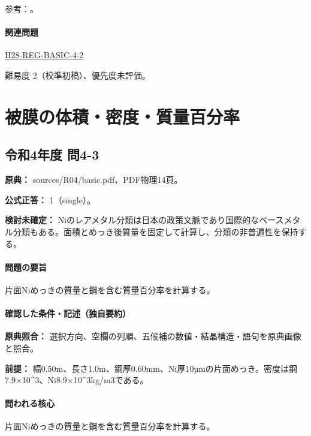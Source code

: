 \par 参考：\cite{iupac_isotopes}。

\paragraph{関連問題} \hyperref[q:h28-reg-basic-4-2]{H28-REG-BASIC-4-2}

\par 難易度 2（校準初稿）、優先度未評価。

\section{被膜の体積・密度・質量百分率}

\subsection{令和4年度 問4-3}
\label{q:r04-reg-basic-4-3}

\noindent\textbf{原典：} sources/R04/basic.pdf、PDF物理14頁。

\textbf{公式正答：} 1（single）。

\par\textbf{検討未確定：} Niのレアメタル分類は日本の政策文脈であり国際的なベースメタル分類もある。面積とめっき後質量を固定して計算し、分類の非普遍性を保持する。

\paragraph{問題の要旨} 片面Niめっきの質量と鋼を含む質量百分率を計算する。

\paragraph{確認した条件・記述（独自要約）}\mbox{}\par

\noindent\textbf{原典照合：} 選択方向、空欄の列順、五候補の数値・結晶構造・語句を原典画像と照合。\par

\noindent\textbf{前提：} 幅0.50m、長さ1.0m、鋼厚0.60mm、Ni厚10µmの片面めっき。密度は鋼7.9×10\textasciicircum{}3、Ni8.9×10\textasciicircum{}3kg/m3である。\par

\paragraph{問われる核心} 片面Niめっきの質量と鋼を含む質量百分率を計算する。

